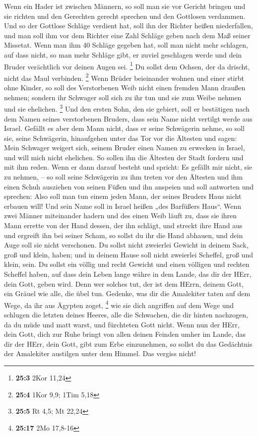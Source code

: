  Wenn ein Hader ist zwischen Männern, so soll man sie vor
Gericht bringen und sie richten und den Gerechten gerecht sprechen und
den Gottlosen verdammen.  Und so der Gottlose Schläge
verdient hat, soll ihn der Richter heißen niederfallen, und man soll ihm
vor dem Richter eine Zahl Schläge geben nach dem Maß seiner Missetat.
 Wenn man ihm 40 Schläge gegeben hat, soll man nicht mehr
schlagen, auf dass nicht, so man mehr Schläge gibt, er zuviel geschlagen
werde und dein Bruder verächtlich vor deinen Augen sei. \footnote{\textbf{25:3}
  2Kor 11,24}  Du sollst dem Ochsen, der da drischt, nicht
das Maul verbinden. \footnote{\textbf{25:4} 1Kor 9,9; 1Tim 5,18}
 Wenn Brüder beieinander wohnen und einer stirbt ohne
Kinder, so soll des Verstorbenen Weib nicht einen fremden Mann draußen
nehmen; sondern ihr Schwager soll sich zu ihr tun und sie zum Weibe
nehmen und sie ehelichen. \footnote{\textbf{25:5} Rt 4,5; Mt 22,24}
 Und den ersten Sohn, den sie gebiert, soll er bestätigen
nach dem Namen seines verstorbenen Bruders, dass sein Name nicht
vertilgt werde aus Israel.  Gefällt es aber dem Mann
nicht, dass er seine Schwägerin nehme, so soll sie, seine Schwägerin,
hinaufgehen unter das Tor vor die Ältesten und sagen: Mein Schwager
weigert sich, seinem Bruder einen Namen zu erwecken in Israel, und will
mich nicht ehelichen.  So sollen ihn die Ältesten der
Stadt fordern und mit ihm reden. Wenn er dann darauf besteht und
spricht: Es gefällt mir nicht, sie zu nehmen, --  so soll
seine Schwägerin zu ihm treten vor den Ältesten und ihm einen Schuh
ausziehen von seinen Füßen und ihn anspeien und soll antworten und
sprechen: Also soll man tun einem jeden Mann, der seines Bruders Haus
nicht erbauen will!  Und sein Name soll in Israel heißen
„des Barfüßers Haus``.  Wenn zwei Männer miteinander
hadern und des einen Weib läuft zu, dass sie ihren Mann errette von der
Hand dessen, der ihn schlägt, und streckt ihre Hand aus und ergreift ihn
bei seiner Scham,  so sollst du ihr die Hand abhauen, und
dein Auge soll sie nicht verschonen.  Du sollst nicht
zweierlei Gewicht in deinem Sack, groß und klein, haben; 
und in deinem Hause soll nicht zweierlei Scheffel, groß und klein, sein.
 Du sollst ein völlig und recht Gewicht und einen
völligen und rechten Scheffel haben, auf dass dein Leben lange währe in
dem Lande, das dir der HErr, dein Gott, geben wird.  Denn
wer solches tut, der ist dem HErrn, deinem Gott, ein Gräuel wie alle,
die übel tun.  Gedenke, was dir die Amalekiter taten auf
dem Wege, da ihr aus Ägypten zoget, \footnote{\textbf{25:17} 2Mo 17,8-16}
 wie sie dich angriffen auf dem Wege und schlugen die
letzten deines Heeres, alle die Schwachen, die dir hinten nachzogen, da
du müde und matt warst, und fürchteten Gott nicht.  Wenn
nun der HErr, dein Gott, dich zur Ruhe bringt von allen deinen Feinden
umher im Lande, das dir der HErr, dein Gott, gibt zum Erbe einzunehmen,
so sollst du das Gedächtnis der Amalekiter austilgen unter dem Himmel.
Das vergiss nicht!


